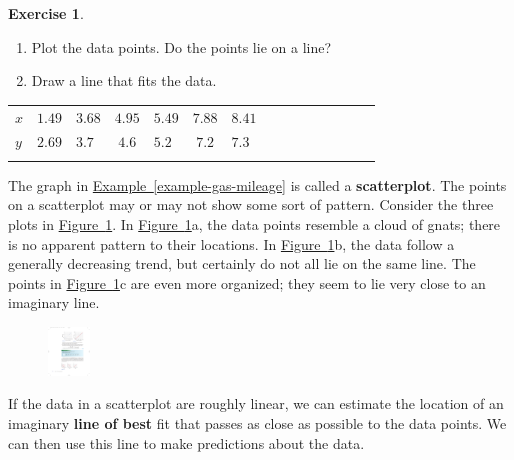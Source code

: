 \documentclass[10pt,]{book}
\newcommand{\terminology}[1]{\textbf{#1}}
\theoremstyle{plain}
\theoremstyle{definition}
\theoremstyle{definition}
\theoremstyle{definition}
\theoremstyle{definition}
\theoremstyle{definition}
\newtheorem{exercise}[theorem]{Exercise}
\numberwithin{equation}{section}
\newcommand{\hrulethin}  {\noalign{\hrule height 0.04em}}
\newcommand{\hrulethick} {\noalign{\hrule height 0.11em}}
\begin{document}
\begin{exercise}\label{exercise-scatterplot}
\leavevmode%
\begin{enumerate}[label=*\alph**]
\item\hypertarget{li-191}{}Plot the data points. Do the points lie on a line?\item\hypertarget{li-192}{}Draw a line that fits the data.\end{enumerate}
\leavevmode%
\begin{table}
\centering
\begin{tabular}{AcAcAcAcAcAcAcA}\hrulethick
\(x\)&\(1.49\)&\(3.68\)&\(4.95\)&\(5.49\)&\(7.88\)&\(8.41\)\tabularnewline\hrulethin
\(y\)&\(2.69\)&\(3.7\)&\(4.6\)&\(5.2\)&\(7.2\)&\(7.3\)\tabularnewline\hrulethin
\end{tabular}
\end{table}
\end{exercise}
\par

    The graph in \hyperref[example-gas-mileage]{Example~\ref{example-gas-mileage}} is called a \terminology{scatterplot}. The points on a scatterplot may or may not show some sort of pattern. Consider the three plots in \hyperref[fig-scatterplots]{Figure~\ref{fig-scatterplots}}. In \hyperref[fig-scatterplots]{Figure~\ref{fig-scatterplots}}a, the data points resemble a cloud of gnats; there is no apparent pattern to their locations. In \hyperref[fig-scatterplots]{Figure~\ref{fig-scatterplots}}b, the data follow a generally decreasing trend, but certainly do not all lie on the same line. The points in \hyperref[fig-scatterplots]{Figure~\ref{fig-scatterplots}}c are even more organized; they seem to lie very close to an imaginary line.
%
\leavevmode%
\begin{figure}
\centering
\includegraphics[width=0.100\textwidth,]{images/fig-scatterplots.pdf}\caption{\label{fig-scatterplots}}
\end{figure}
\par

    If the data in a scatterplot are roughly linear, we can estimate the location of an imaginary \terminology{line of best} fit that passes as close as possible to the data points. We can then use this line to make predictions about the data.%
\typeout{************************************************}
\typeout{************************************************}
\end{document}
